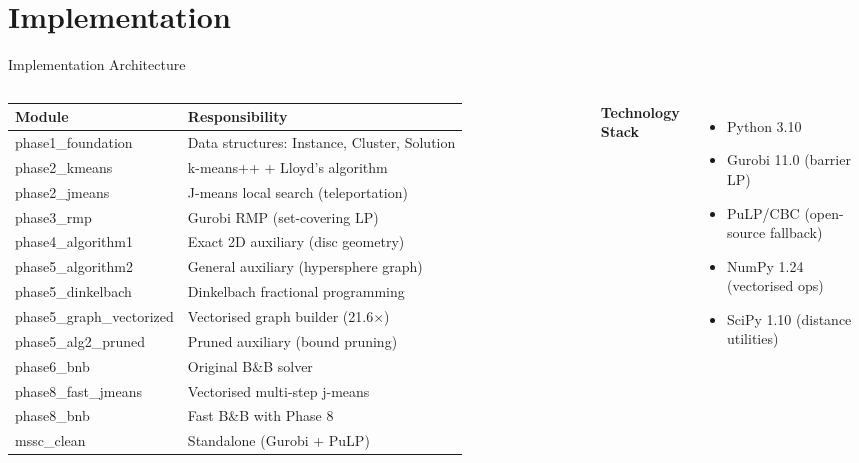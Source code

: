 \documentclass[aspectratio=169,12pt]{beamer}
\begin{document}
\section{Implementation}

\begin{frame}{Implementation Architecture}
  \begin{columns}[T]
    \small
    \begin{tabular}{>{\ttfamily\tiny}l p{4.8cm}}
      \toprule
      \normalfont\textbf{Module} & \textbf{Responsibility} \\
      \midrule
      phase1\_foundation & Data structures: Instance, Cluster, Solution \\
      phase2\_kmeans & k-means++ + Lloyd's algorithm \\
      phase2\_jmeans & J-means local search (teleportation) \\
      phase3\_rmp & Gurobi RMP (set-covering LP) \\
      phase4\_algorithm1 & Exact 2D auxiliary (disc geometry) \\
      phase5\_algorithm2 & General auxiliary (hypersphere graph) \\
      phase5\_dinkelbach & Dinkelbach fractional programming \\
      phase5\_graph\_vectorized & Vectorised graph builder (21.6$\times$) \\
      phase5\_alg2\_pruned & Pruned auxiliary (bound pruning) \\
      phase6\_bnb & Original B\&B solver \\
      phase8\_fast\_jmeans & Vectorised multi-step j-means \\
      phase8\_bnb & Fast B\&B with Phase 8 \\
      mssc\_clean & Standalone (Gurobi + PuLP) \\
      \bottomrule
    \end{tabular}

    \textbf{Technology Stack}
    \begin{itemize}
      \item Python 3.10
      \item Gurobi 11.0 (barrier LP)
      \item PuLP/CBC (open-source fallback)
      \item NumPy 1.24 (vectorised ops)
      \item SciPy 1.10 (distance utilities)
    \end{itemize}


\end{columns}
\end{frame}
\end{document}
